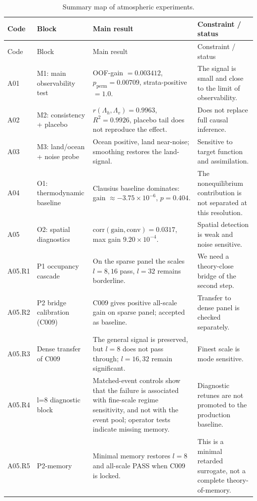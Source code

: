 \documentclass[11pt,a4paper]{article}
\theoremstyle{definition}
\theoremstyle{plain}
\theoremstyle{remark}
\begin{document}
{\small
\begin{longtable}{@{}p{1.3cm}p{3.3cm}p{5.0cm}p{3.6cm}@{}}
\caption{Summary map of atmospheric experiments.}\label{tab:appendix_a_map}\\
\toprule
Code & Block & Main result & Constraint / status \\
\midrule
\endfirsthead
\toprule
Code & Block & Main result & Constraint / status \\
\midrule
\endhead
A01 & M1: main observability test & OOF-gain $=0.003412$, $p_{\mathrm{perm}}=0.00709$, strata-positive $=1.0$. & The signal is small and close to the limit of observability. \\
A02 & M2: consistency + placebo & $r(\Lambda_h,\Lambda_v)=0.9963$, $R^2=0.9926$, placebo tail does not reproduce the effect. & Does not replace full causal inference. \\
A03 & M3: land/ocean + noise probe & Ocean positive, land near-noise; smoothing restores the land-signal. & Sensitive to target function and assimilation. \\
A04 & O1: thermodynamic baseline & Clausius baseline dominates: gain $\approx-3.75\times10^{-6}$, $p=0.404$. & The nonequilibrium contribution is not separated at this resolution. \\
A05 & O2: spatial diagnostics & $\mathrm{corr}(\mathrm{gain},\mathrm{conv})=0.0317$, max gain $9.20\times10^{-4}$. & Spatial detection is weak and noise sensitive. \\
A05.R1 & P1 occupancy cascade & On the sparse panel the scales $l=8,16$ pass, $l=32$ remains borderline. & We need a theory-close bridge of the second step. \\
A05.R2 & P2 bridge calibration (C009) & C009 gives positive all-scale gain on sparse panel; accepted as baseline. & Transfer to dense panel is checked separately. \\
A05.R3 & Dense transfer of C009 & The general signal is preserved, but $l=8$ does not pass through; $l=16,32$ remain significant. & Finest scale is mode sensitive. \\
A05.R4 & l=8 diagnostic block & Matched-event controls show that the failure is associated with fine-scale regime sensitivity, and not with the event pool; operator tests indicate missing memory. & Diagnostic retunes are not promoted to the production baseline. \\
A05.R5 & P2-memory & Minimal memory restores $l=8$ and all-scale PASS when C009 is locked. & This is a minimal retarded surrogate, not a complete theory-of-memory. \\

\end{longtable}}
\end{document}
